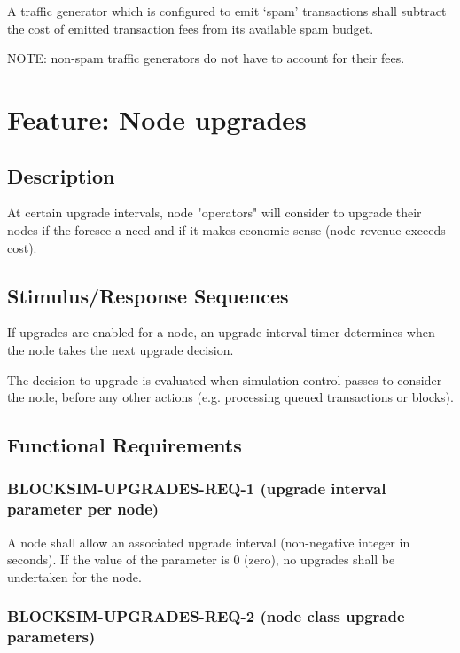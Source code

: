 \documentclass{scrreprt}
\begin{document}
A traffic generator which is configured to emit `spam' transactions
shall subtract the cost of emitted transaction fees from its available
spam budget.

NOTE: non-spam traffic generators do not have to account for their fees.




\section{Feature: Node upgrades}

\subsection{Description}

At certain upgrade intervals, node "operators" will consider to upgrade
their nodes if the foresee a need and if it makes economic sense
(node revenue exceeds cost).


\subsection{Stimulus/Response Sequences}

If upgrades are enabled for a node, an upgrade interval timer determines
when the node takes the next upgrade decision.

The decision to upgrade is evaluated when simulation control passes to
consider the node, before any other actions (e.g. processing queued
transactions or blocks).


\subsection{Functional Requirements}

\subsubsection{BLOCKSIM-UPGRADES-REQ-1 (upgrade interval parameter per node)}

A node shall allow an associated upgrade interval (non-negative integer in seconds).
If the value of the parameter is 0 (zero), no upgrades shall be undertaken
for the node.

\subsubsection{BLOCKSIM-UPGRADES-REQ-2 (node class upgrade parameters)}
\end{document}
